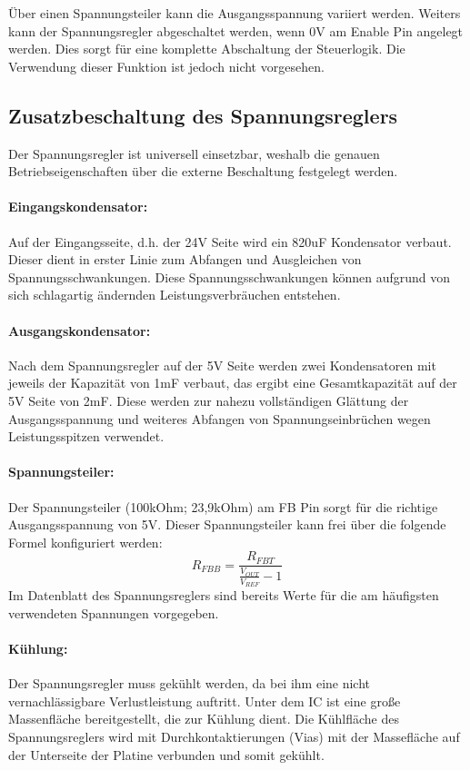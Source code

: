 \documentclass[a4paper, twoside, 12pt, openright]{memoir}
\begin{document}
Über einen Spannungsteiler kann die Ausgangsspannung variiert werden.
Weiters kann der Spannungsregler abgeschaltet werden, wenn 0V am Enable Pin angelegt werden.
Dies sorgt für eine komplette Abschaltung der Steuerlogik.
Die Verwendung dieser Funktion ist jedoch nicht vorgesehen.

\subsection{Zusatzbeschaltung des Spannungsreglers}
Der Spannungsregler ist universell einsetzbar, weshalb die genauen Betriebseigenschaften über die externe Beschaltung festgelegt werden.
\paragraph{Eingangskondensator:}
Auf der Eingangsseite, d.h. der 24V Seite wird ein 820uF Kondensator verbaut.
Dieser dient in erster Linie zum Abfangen und Ausgleichen von Spannungsschwankungen.
Diese Spannungsschwankungen können aufgrund von sich schlagartig ändernden Leistungsverbräuchen entstehen.

\paragraph{Ausgangskondensator:}
Nach dem Spannungsregler auf der 5V Seite werden zwei Kondensatoren mit jeweils der Kapazität von 1mF verbaut, das ergibt eine Gesamtkapazität auf der 5V Seite von 2mF.
Diese werden zur nahezu vollständigen Glättung der Ausgangsspannung und weiteres Abfangen von Spannungseinbrüchen wegen Leistungsspitzen verwendet.

\paragraph{Spannungsteiler:}
Der Spannungsteiler (100kOhm; 23,9kOhm) am FB Pin sorgt für die richtige Ausgangsspannung von 5V.
Dieser Spannungsteiler kann frei über die folgende Formel konfiguriert werden:
\[R_{FBB}=\frac{R_{FBT}}{\frac{V_{OUT}}{V_{REF}}-1}\]
Im Datenblatt des Spannungsreglers sind bereits Werte für die am häufigsten verwendeten Spannungen vorgegeben.

\paragraph{Kühlung:}
Der Spannungsregler muss gekühlt werden, da bei ihm eine nicht vernachlässigbare Verlustleistung auftritt.
Unter dem IC ist eine große Massenfläche bereitgestellt, die zur Kühlung dient.
Die Kühlfläche des Spannungsreglers wird mit Durchkontaktierungen (Vias) mit der Massefläche auf der Unterseite der Platine verbunden und somit gekühlt.
\end{document}
